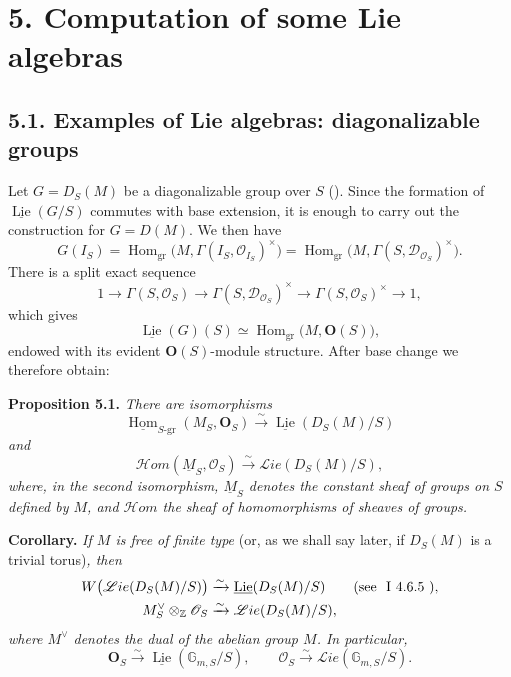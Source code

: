 
\section*{5. Computation of some Lie algebras}

\subsection*{5.1. Examples of Lie algebras: diagonalizable groups}

Let \(G=D_S(M)\) be a diagonalizable group over \(S\) (). Since
the formation of \(\underline{\operatorname{Lie}}(G/S)\) commutes with
base extension, it is enough to carry out the construction for
\(G=D(M)\). We then have
\[
 G(I_S)=\operatorname{Hom}_{\mathrm{gr}}
   \bigl(M,\Gamma(I_S,\mathscr O_{I_S})^\times\bigr)
 =\operatorname{Hom}_{\mathrm{gr}}
   \bigl(M,\Gamma(S,\mathscr D_{\mathscr O_S})^\times\bigr).
\]
There is a split exact sequence
\[
 1\longrightarrow\Gamma(S,\mathscr O_S)
  \longrightarrow\Gamma(S,\mathscr D_{\mathscr O_S})^\times
  \longrightarrow\Gamma(S,\mathscr O_S)^\times
  \longrightarrow1,
\]
which gives
\[
 \underline{\operatorname{Lie}}(G)(S)\simeq
 \operatorname{Hom}_{\mathrm{gr}}\bigl(M,\mathbf O(S)\bigr),
\]
endowed with its evident \(\mathbf O(S)\)-module structure. After base
change we therefore obtain:

\medskip
\noindent{}\textbf{Proposition 5.1.}
\textit{There are isomorphisms}
\[
 \underline{\operatorname{Hom}}_{S\text{-}\mathrm{gr}}
      (M_S,\mathbf O_S)
 \xrightarrow{\sim}
 \underline{\operatorname{Lie}}(D_S(M)/S)
\]
\textit{and}
\[
 \mathscr Hom(\underline M_S,\mathscr O_S)
 \xrightarrow{\sim}
 \mathscr Lie(D_S(M)/S),
\]
\textit{where, in the second isomorphism, \(\underline M_S\) denotes
the constant sheaf of groups on \(S\) defined by \(M\), and
\(\mathscr Hom\) the sheaf of homomorphisms of sheaves of groups.}

\medskip
\noindent{}\textbf{Corollary.}
\textit{If \(M\) is free of finite type} (or, as we shall say later,
if \(D_S(M)\) is a trivial torus)\textit{, then}
\[
\begin{aligned}
 W\bigl(\mathscr Lie(D_S(M)/S)\bigr)
   &\xrightarrow{\sim}\underline{\operatorname{Lie}}(D_S(M)/S)
   \qquad\textup{(see \SGARefLink{sga3:i:proposition:4-6-5}{I~4.6.5})},\\
 M^\vee_S\otimes_{\mathbb Z}\mathscr O_S
   &\xrightarrow{\sim}\mathscr Lie(D_S(M)/S),
\end{aligned}
\]
\textit{where \(M^\vee\) denotes the dual of the abelian group \(M\).
In particular,}
\[
 \mathbf O_S\xrightarrow{\sim}
   \underline{\operatorname{Lie}}(\mathbb G_{m,S}/S),
 \qquad
 \mathscr O_S\xrightarrow{\sim}
   \mathscr Lie(\mathbb G_{m,S}/S).
\]

